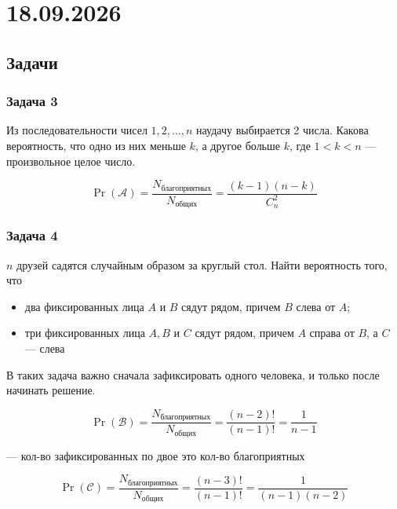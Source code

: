 \section{18.09.2026} 

\subsection{Задачи}

\subsubsection{Задача 3}

\begin{exercise}
    Из последовательности чисел $1, 2, \ldots, n$ наудачу выбирается 2 числа. Какова вероятность, что одно из них меньше $k$, а другое больше $k$, где $1 < k < n$ --- произвольное целое число.
\end{exercise}

\begin{solution}
    \[
        \Pr(\mathcal{A}) = \frac{N_{\text{благоприятных}} }{N_{\text{общих}}} = \frac{(k-1)(n-k)}{C^2_n}
    \]
\end{solution}

\subsubsection{Задача 4}

\begin{exercise}
    $n$ друзей садятся случайным образом за круглый стол. Найти вероятность того, что
    \begin{itemize}
        \item[а)] два фиксированных лица $A$ и $B$ сядут рядом, причем $B$ слева от $A$;
        \item[б)] три фиксированных лица $A, B$ и $C$ сядут рядом, причем $A$ справа от $B$, а $C$ --- слева 
    \end{itemize}
\end{exercise}

\begin{solution}
    В таких задача важно сначала зафиксировать одного человека, и только после начинать решение.

\[
    \Pr(\mathcal{B}) = \frac{N_{\text{благоприятных}} }{N_{\text{общих}}} = \frac{(n-2)!}{(n-1)!} = \frac{1}{n - 1}
\]

--- кол-во зафиксированных по двое это кол-во благоприятных

\[
    \Pr(\mathcal{C}) = \frac{N_{\text{благоприятных}} }{N_{\text{общих}}} = \frac{(n-3)!}{(n-1)!} = \frac{1}{(n - 1)(n - 2)}
\]
\end{solution}

